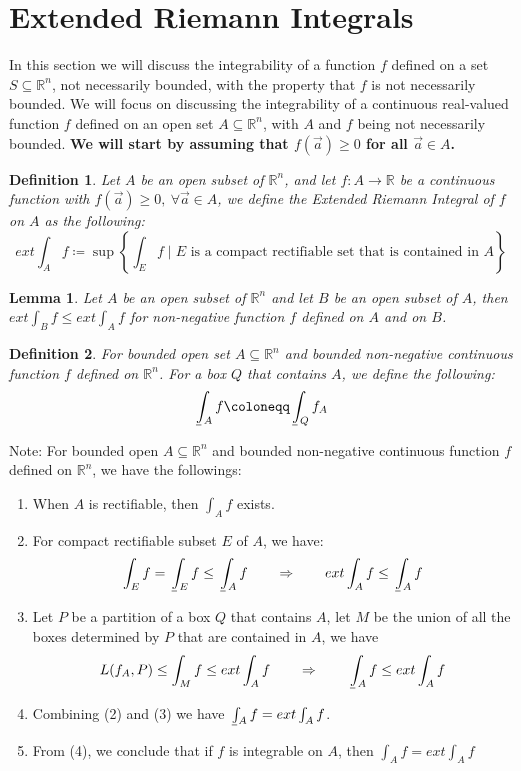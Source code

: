 \documentclass[15pt]{book}
\theoremstyle{break}
\theoremstyle{break}
\newtheorem{lem}{Lemma}[thm]
\newtheorem{defn}{Definition}[corL]
\def\lowint{\mkern3mu\underline{\vphantom{\intop}\mkern7mu}\mkern-10mu\int}
\newcommand{\R}{\mathbb{R}}
\newcommand{\note}{\color{red}Note: \color{black}}
\begin{document}
\newpage
\section[Extended Riemann Integrals]{\color{red}Extended Riemann Integrals \color{black}}

In this section we will discuss the integrability of a function $f$ defined on a set $S\subseteq \R^n$, not necessarily bounded, with the property that $f$ is not necessarily bounded. We will focus on discussing the integrability of a continuous real-valued function $f$ defined on an open set $A\subseteq \R^n$, with $A$ and $f$ being not necessarily bounded. \textbf{We will start by assuming that $f(\vec{a}) \geq 0$ for all $\vec{a}\in A$.}

\begin{defn}
Let $A$ be an open subset of $\R^n$, and let $f:A \to \R$ be a continuous function with $f(\vec{a}) \geq 0,\ \forall\vec{a}\in A$, we define the Extended Riemann Integral of $f$ on $A$ as the following:
$$ext \int_A f \coloneqq \sup\left\{ \int_E f  \mid E \text{ is a compact rectifiable set that is contained in } A\right\}$$
\end{defn}

\begin{lem}
Let $A$ be an open subset of $\R^n$ and let $B$ be an open subset of $A$, then $ext \int_B f  \leq ext \int_A f$ for non-negative function $f$ defined on $A$ and on $B$. 
\end{lem}

\begin{defn}
For bounded open set $A\subseteq \R^n$ and bounded non-negative continuous function $f$ defined on $\R^n$. For a box $Q$ that contains $A$, we define the following: $$\lowint_A f \coloneqq \lowint_Q f_A$$ 
\end{defn}

\note For bounded open $A\subseteq \R^n$ and bounded non-negative continuous function $f$ defined on $\R^n$, we have the followings:
\begin{enumerate}[topsep=3pt,itemsep=-1ex,partopsep=1ex,parsep=1ex]
\item When $A$ is rectifiable, then $\int_A f$ exists.
\item For compact rectifiable subset $E$ of $A$, we have:
$$\int_E f = \lowint_E f \leq \lowint_A f \qquad \Rightarrow \qquad ext \int_A f \leq \lowint_A f$$
\item Let $P$ be a partition of a box $Q$ that contains $A$, let $M$ be the union of all the boxes determined by $P$ that are contained in $A$, we have $$L(f_A, P ) \leq \int_{M} f \leq ext \int_A f
\qquad \Rightarrow\qquad \lowint_A f \leq ext \int_A f$$
\item Combining (2) and (3) we have $\lowint_A f = ext \int_A f$.
\item From (4), we conclude that if $f$ is integrable on $A$, then $\int_A f = ext\int_A f$
\end{enumerate}
\end{document}
